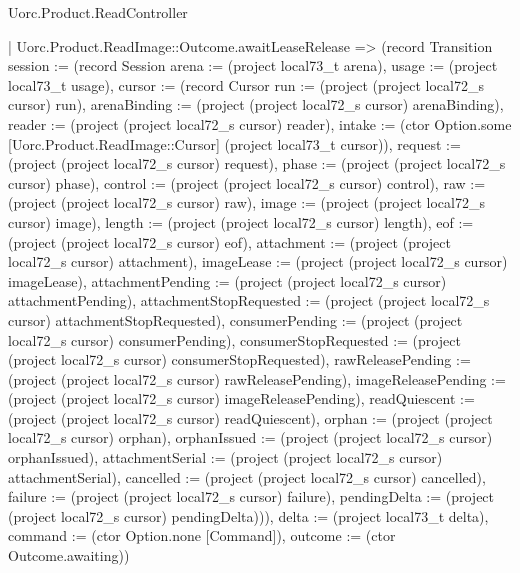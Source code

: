 \begin{lexlean}{Uorc.Product.ReadController}
\begin{semanticmodule}
{    | Uorc.Product.ReadImage::Outcome.awaitLeaseRelease => (record Transition {session := (record Session {arena := (project local73_t arena), usage := (project local73_t usage), cursor := (record Cursor {run := (project (project local72_s cursor) run), arenaBinding := (project (project local72_s cursor) arenaBinding), reader := (project (project local72_s cursor) reader), intake := (ctor Option.some [Uorc.Product.ReadImage::Cursor] (project local73_t cursor)), request := (project (project local72_s cursor) request), phase := (project (project local72_s cursor) phase), control := (project (project local72_s cursor) control), raw := (project (project local72_s cursor) raw), image := (project (project local72_s cursor) image), length := (project (project local72_s cursor) length), eof := (project (project local72_s cursor) eof), attachment := (project (project local72_s cursor) attachment), imageLease := (project (project local72_s cursor) imageLease), attachmentPending := (project (project local72_s cursor) attachmentPending), attachmentStopRequested := (project (project local72_s cursor) attachmentStopRequested), consumerPending := (project (project local72_s cursor) consumerPending), consumerStopRequested := (project (project local72_s cursor) consumerStopRequested), rawReleasePending := (project (project local72_s cursor) rawReleasePending), imageReleasePending := (project (project local72_s cursor) imageReleasePending), readQuiescent := (project (project local72_s cursor) readQuiescent), orphan := (project (project local72_s cursor) orphan), orphanIssued := (project (project local72_s cursor) orphanIssued), attachmentSerial := (project (project local72_s cursor) attachmentSerial), cancelled := (project (project local72_s cursor) cancelled), failure := (project (project local72_s cursor) failure), pendingDelta := (project (project local72_s cursor) pendingDelta)})}), delta := (project local73_t delta), command := (ctor Option.none [Command]), outcome := (ctor Outcome.awaiting)})
}
\end{semanticmodule}
\end{lexlean}
